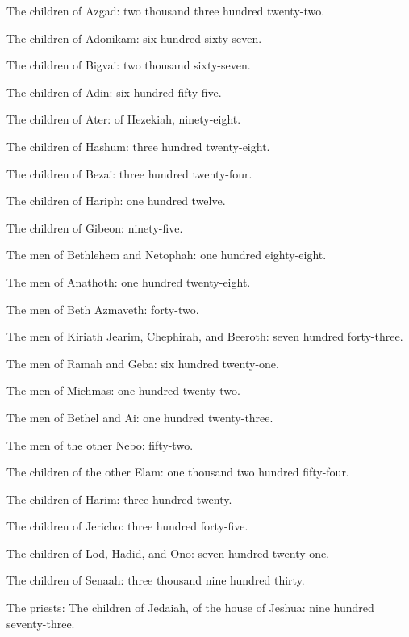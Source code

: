 {\par }{\LI {}The children of Azgad: two thousand three hundred twenty-two.
\par }{\LI {}The children of Adonikam: six hundred sixty-seven.
\par }{\LI {}The children of Bigvai: two thousand sixty-seven.
\par }{\LI {}The children of Adin: six hundred fifty-five.
\par }{\LI {}The children of Ater: of Hezekiah, ninety-eight.
\par }{\LI {}The children of Hashum: three hundred twenty-eight.
\par }{\LI {}The children of Bezai: three hundred twenty-four.
\par }{\LI {}The children of Hariph: one hundred twelve.
\par }{\LI {}The children of Gibeon: ninety-five.
\par }{\LI {}The men of Bethlehem and Netophah: one hundred eighty-eight.
\par }{\LI {}The men of Anathoth: one hundred twenty-eight.
\par }{\LI {}The men of Beth Azmaveth: forty-two.
\par }{\LI {}The men of Kiriath Jearim, Chephirah, and Beeroth: seven hundred forty-three.
\par }{\LI {}The men of Ramah and Geba: six hundred twenty-one.
\par }{\LI {}The men of Michmas: one hundred twenty-two.
\par }{\LI {}The men of Bethel and Ai: one hundred twenty-three.
\par }{\LI {}The men of the other Nebo: fifty-two.
\par }{\LI {}The children of the other Elam: one thousand two hundred fifty-four.
\par }{\LI {}The children of Harim: three hundred twenty.
\par }{\LI {}The children of Jericho: three hundred forty-five.
\par }{\LI {}The children of Lod, Hadid, and Ono: seven hundred twenty-one.
\par }{\LI {}The children of Senaah: three thousand nine hundred thirty.
\par }{\BB \par }{\LI {}The priests: The children of Jedaiah, of the house of Jeshua: nine hundred seventy-three.
}
